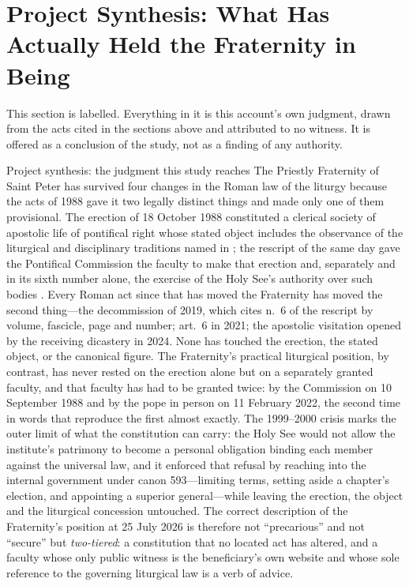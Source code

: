 \section{Project Synthesis: What Has Actually Held the Fraternity in Being}

This section is labelled. Everything in it is this account's own
judgment, drawn from the acts cited in the sections above and attributed
to no witness. It is offered as a conclusion of the study, not as a
finding of any authority.

\begin{studybox}{Project synthesis: the judgment this study reaches}
The Priestly Fraternity of Saint Peter has survived four changes in the
Roman law of the liturgy because the acts of 1988 gave it two legally
distinct things and made only one of them provisional. The erection of 18
October 1988 constituted a clerical society of apostolic life of
pontifical right whose stated object includes the observance of the
liturgical and disciplinary traditions named in ; the
rescript  of the same day gave the Pontifical
Commission the faculty to make that erection and, separately and in its
sixth number alone, the exercise of the Holy See's authority over such
bodies . Every Roman act since that has
moved the Fraternity has moved the second thing---the decommission of
2019, which cites n.~6 of the rescript by volume, fascicle, page and
number;  art.~6 in 2021; the apostolic
visitation opened by the receiving dicastery in 2024. None has touched
the erection, the stated object, or the canonical figure. The Fraternity's
practical liturgical position, by contrast, has never rested on the
erection alone but on a separately granted faculty, and that faculty has
had to be granted twice: by the Commission on 10 September 1988 and by
the pope in person on 11 February 2022, the second time in words that
reproduce the first almost exactly. The 1999--2000 crisis marks the outer
limit of what the constitution can carry: the Holy See would not allow
the institute's patrimony to become a personal obligation binding each
member against the universal law, and it enforced that refusal by
reaching into the internal government under canon 593---limiting terms,
setting aside a chapter's election, and appointing a superior
general---while leaving the erection, the object and the liturgical
concession untouched. The correct description of the Fraternity's position at 25
July 2026 is therefore not ``precarious'' and not ``secure'' but
\emph{two-tiered}: a constitution that no located act has altered, and a
faculty whose only public witness is the beneficiary's own website and
whose sole reference to the governing liturgical law is a verb of advice.
\end{studybox}

